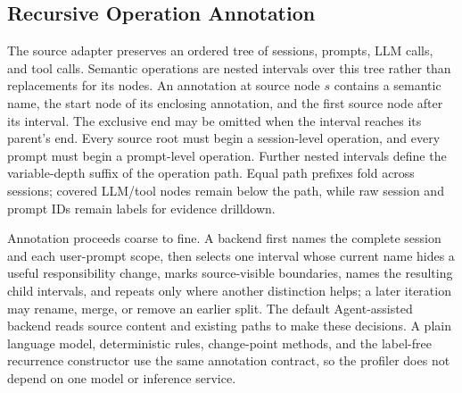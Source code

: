 \documentclass[letterpaper]{article}
\begin{document}
\subsection{Recursive Operation Annotation}
\label{sec:intent}

The source adapter preserves an ordered tree of sessions, prompts, LLM calls,
and tool calls. Semantic operations are nested intervals over this tree rather
than replacements for its nodes.
An annotation at source node $s$ contains a semantic name, the start node of
its enclosing annotation, and the first source node after its interval.
The exclusive end may be omitted when the interval reaches its parent's end.
Every source root must begin a session-level operation, and every prompt must
begin a prompt-level operation. Further nested intervals define the
variable-depth suffix of the operation path. Equal path prefixes fold across
sessions; covered LLM/tool nodes remain below the path, while raw session and
prompt IDs remain labels for evidence drilldown.

Annotation proceeds coarse to fine. A backend first names the complete session
and each user-prompt scope, then selects one interval whose current name hides
a useful responsibility change, marks source-visible boundaries, names the
resulting child intervals, and repeats only where another distinction helps; a
later iteration may rename, merge, or remove an earlier split.
The default Agent-assisted backend reads source content and existing paths to
make these decisions. A plain language model, deterministic rules, change-point
methods, and the label-free recurrence constructor use the same annotation
contract, so the profiler does not depend on one model or inference service.
\end{document}
